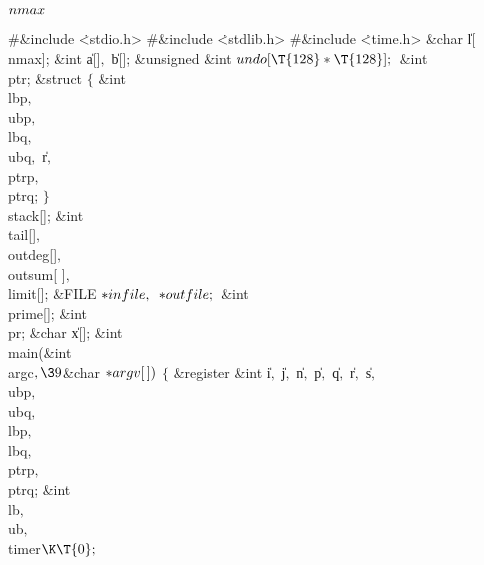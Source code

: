 \Y\B\4\D$\\{nmax}$ \5
\par
\Y\B\8\#\&{include} \.{<stdio.h>}\6
\8\#\&{include} \.{<stdlib.h>}\6
\8\#\&{include} \.{<time.h>}\6
\&{char} \|l[\\{nmax}];\6
\&{int} \|a[]${},{}$ \|b[];\6
\&{unsigned} \&{int} ${}\\{undo}[\T{128}*\T{128}];{}$\6
\&{int} \\{ptr};\6
\&{struct} ${}\{{}$\1\6
\&{int} \\{lbp}${},{}$ \\{ubp}${},{}$ \\{lbq}${},{}$ \\{ubq}${},{}$ \|r${},{}$ %
\\{ptrp}${},{}$ \\{ptrq};\2\6
${}\}{}$ \\{stack}[];\6
\&{int} \\{tail}[]${},{}$ \\{outdeg}[]${},{}$ \\{outsum}[%
]${},{}$ \\{limit}[];\6
\&{FILE} ${}{*}\\{infile},{}$ ${}{*}\\{outfile};{}$\6
\&{int} \\{prime}[];\6
\&{int} \\{pr};\6
\&{char} \|x[];\7
\&{int} \\{main}(\&{int} \\{argc}${},\39{}$\&{char} ${}{*}\\{argv}[\,]){}$\1\1%
\2\2\6
${}\{{}$\1\6
\&{register} \&{int} \|i${},{}$ \|j${},{}$ \|n${},{}$ \|p${},{}$ \|q${},{}$ %
\|r${},{}$ \|s${},{}$ \\{ubp}${},{}$ \\{ubq}${},{}$ \\{lbp}${},{}$ %
\\{lbq}${},{}$ \\{ptrp}${},{}$ \\{ptrq};\6
\&{int} \\{lb}${},{}$ \\{ub}${},{}$ \\{timer}${}\K\T{0};{}$\7
